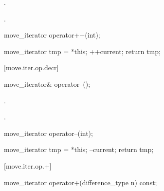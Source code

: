 \begin{itemdescr}
\pnum
\effects {}.

\pnum
\returns {}.
\end{itemdescr}

%
%
\begin{itemdecl}
move_iterator operator++(int);
\end{itemdecl}

\begin{itemdescr}
\pnum
\effects
\begin{codeblock}
move_iterator tmp = *this;
++current;
return tmp;
\end{codeblock}
\end{itemdescr}

[move.iter.op.decr]{}

%
%
\begin{itemdecl}
move_iterator& operator--();
\end{itemdecl}

\begin{itemdescr}
\pnum
\effects {}.

\pnum
\returns {}.
\end{itemdescr}

%
%
\begin{itemdecl}
move_iterator operator--(int);
\end{itemdecl}

\begin{itemdescr}
\pnum
\effects
\begin{codeblock}
move_iterator tmp = *this;
--current;
return tmp;
\end{codeblock}
\end{itemdescr}

[move.iter.op.+]{}

%
%
\begin{itemdecl}
move_iterator operator+(difference_type n) const;
\end{itemdecl}


